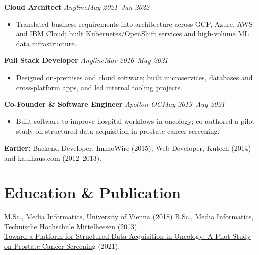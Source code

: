 \documentclass[11pt,a4paper]{article}
\newcommand{\role}[3]{\textbf{#1} \textit{#2}\hfill\textit{#3}\par}
\begin{document}
\vspace{2pt}
\role{Cloud Architect}{Anyline}{May 2021--Jan 2022}
\begin{itemize}
\item Translated business requirements into architecture across GCP, Azure, AWS and IBM Cloud; built Kubernetes/OpenShift services and high-volume ML data infrastructure.
\end{itemize}
\vspace{2pt}
\role{Full Stack Developer}{Anyline}{Mar 2016--May 2021}
\begin{itemize}
\item Designed on-premises and cloud software; built microservices, databases and cross-platform apps, and led internal tooling projects.
\end{itemize}
\vspace{2pt}
\role{Co-Founder \& Software Engineer}{Apollon OG}{May 2019--Aug 2021}
\begin{itemize}
\item Built software to improve hospital workflows in oncology; co-authored a pilot study on structured data acquisition in prostate cancer screening.
\end{itemize}
\vspace{2pt}
\textbf{Earlier:} Backend Developer, ImmoWire (2015); Web Developer, Kutech (2014) and kaufhaus.com (2012--2013).
\section*{Education \& Publication}
M.Sc., Media Informatics, University of Vienna (2018) \textbar{} B.Sc., Media Informatics, Technische Hochschule Mittelhessen (2013).\\
\href{https://www.researchgate.net/publication/354259954_Toward_a_Platform_for_Structured_Data_Acquisition_in_Oncology_A_Pilot_Study_on_Prostate_Cancer_Screening}{Toward a Platform for Structured Data Acquisition in Oncology: A Pilot Study on Prostate Cancer Screening} (2021).
\end{document}
